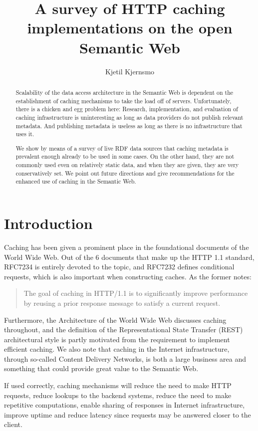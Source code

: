 \documentclass{llncs}
\title{A survey of HTTP caching implementations on the open Semantic Web}
\author{Kjetil Kjernsmo}
\institute{Department of Informatics,
Postboks 1080 Blindern,
N-0316 Oslo, Norway \email{kjetil@kjernsmo.net}}
\begin{document}
\maketitle

\begin{abstract}
Scalability of the data access architecture in the Semantic Web is
dependent on the establishment of caching mechanisms to take the load
off of servers.  Unfortunately, there is a chicken and egg problem
here: Research, implementation, and evaluation of caching
infrastructure is uninteresting as long as data providers do not
publish relevant metadata.  And publishing metadata is useless as long
as there is no infrastructure that uses it.

We show by means of a survey of live RDF data sources that caching
metadata is prevalent enough already to be used in some cases.  On the
other hand, they are not commonly used even on relatively static data,
and when they are given, they are very conservatively set. We point
out future directions and give recommendations for the enhanced use of
caching in the Semantic Web.
\end{abstract}

\section{Introduction}

Caching has been given a prominent place in the foundational documents
of the World Wide Web. Out of the 6 documents that make up the HTTP
1.1 standard, RFC7234 \cite{rfc7234} is entirely devoted to the topic,
and RFC7232 \cite{rfc7232} defines conditional requests, which is also
important when constructing caches. As the former notes:
\begin{quote} 
  The goal of caching in HTTP/1.1 is to significantly improve
  performance by reusing a prior response message to satisfy a current
  request.
\end{quote}
Furthermore, the Architecture of the World Wide Web
\cite{Jacobs:04:AWW} discusses caching throughout, and the definition
of the Representational State Transfer (REST) architectural style
\cite{Fielding_2000_Architectural-Styles} is partly motivated from the
requirement to implement efficient caching. We also note that caching
in the Internet infrastructure, through so-called Content Delivery
Networks, is both a large business area and something that could
provide great value to the Semantic Web.

If used correctly, caching mechanisms will reduce the need to make
HTTP requests, reduce lookups to the backend systems, reduce the need
to make repetitive computations, enable sharing of responses in
Internet infrastructure, improve uptime and reduce latency since
requests may be answered closer to the client.
\end{document}
